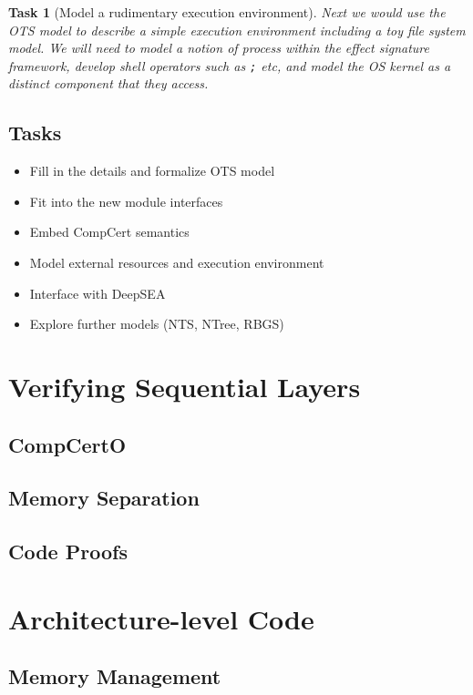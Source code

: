 \documentclass{article}
\newtheorem{task}{Task}
\begin{document}
\begin{task}[Model a rudimentary execution environment]
Next we would use the OTS model to describe a simple execution environment
including a toy file system model.
We will need to model a notion of process within the effect signature framework,
develop shell operators such as \texttt{;} etc, and
model the OS kernel as a distinct component that they access.
\end{task}


\subsection{Tasks} %

\begin{itemize}
\item Fill in the details and formalize OTS model
\item Fit into the new module interfaces
\item Embed CompCert semantics
\item Model external resources and execution environment
\item Interface with DeepSEA
\item Explore further models (NTS, NTree, RBGS)
\end{itemize}




\newpage

\section{Verifying Sequential Layers}

\subsection{CompCertO}
\subsection{Memory Separation}
\subsection{Code Proofs}

\section{Architecture-level Code}
\subsection{Memory Management}
\end{document}
